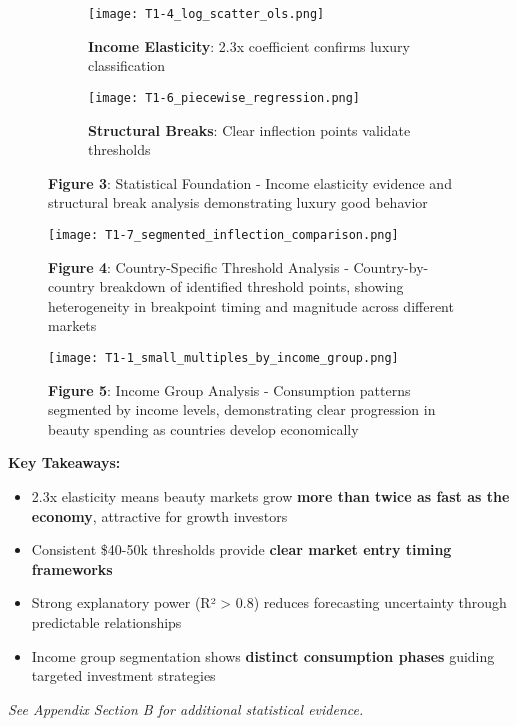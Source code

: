 \documentclass[11pt]{article}
\begin{document}
\begin{figure}[H]
\centering
\begin{subfigure}[b]{0.48\textwidth}
    \texttt{[image: T1-4\_log\_scatter\_ols.png]}
    \caption{\textbf{Income Elasticity}: 2.3x coefficient confirms luxury classification}
\end{subfigure}
\hfill
\begin{subfigure}[b]{0.48\textwidth}
    \texttt{[image: T1-6\_piecewise\_regression.png]}
    \caption{\textbf{Structural Breaks}: Clear inflection points validate thresholds}
\end{subfigure}
\caption{\textbf{Figure 3}: Statistical Foundation - Income elasticity evidence and structural break analysis demonstrating luxury good behavior}
\end{figure}

\begin{figure}[H]
\centering
\texttt{[image: T1-7\_segmented\_inflection\_comparison.png]}
\caption{\textbf{Figure 4}: Country-Specific Threshold Analysis - Country-by-country breakdown of identified threshold points, showing heterogeneity in breakpoint timing and magnitude across different markets}
\end{figure}

\begin{figure}[H]
\centering
\texttt{[image: T1-1\_small\_multiples\_by\_income\_group.png]}
\caption{\textbf{Figure 5}: Income Group Analysis - Consumption patterns segmented by income levels, demonstrating clear progression in beauty spending as countries develop economically}
\end{figure}

\textbf{Key Takeaways:}
\vspace{-3pt}
\begin{itemize}
    \setlength{\itemsep}{1pt}
    \item 2.3x elasticity means beauty markets grow \textbf{more than twice as fast as the economy}, attractive for growth investors
    \item Consistent \$40-50k thresholds provide \textbf{clear market entry timing frameworks}
    \item Strong explanatory power (R² > 0.8) reduces forecasting uncertainty through predictable relationships
    \item Income group segmentation shows \textbf{distinct consumption phases} guiding targeted investment strategies
\end{itemize}
\textit{See Appendix Section B for additional statistical evidence.}
\end{document}
